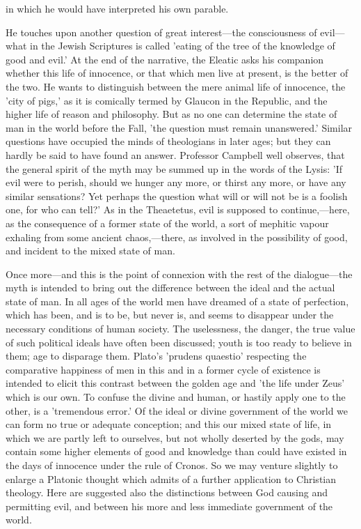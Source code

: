 \documentclass[11pt,letter]{article}
\begin{document}
in which he would have interpreted his own parable.

\par  He touches upon another question of great interest—the consciousness of evil—what in the Jewish Scriptures is called 'eating of the tree of the knowledge of good and evil.' At the end of the narrative, the Eleatic asks his companion whether this life of innocence, or that which men live at present, is the better of the two. He wants to distinguish between the mere animal life of innocence, the 'city of pigs,' as it is comically termed by Glaucon in the Republic, and the higher life of reason and philosophy. But as no one can determine the state of man in the world before the Fall, 'the question must remain unanswered.' Similar questions have occupied the minds of theologians in later ages; but they can hardly be said to have found an answer. Professor Campbell well observes, that the general spirit of the myth may be summed up in the words of the Lysis: 'If evil were to perish, should we hunger any more, or thirst any more, or have any similar sensations? Yet perhaps the question what will or will not be is a foolish one, for who can tell?' As in the Theaetetus, evil is supposed to continue,—here, as the consequence of a former state of the world, a sort of mephitic vapour exhaling from some ancient chaos,—there, as involved in the possibility of good, and incident to the mixed state of man.

\par  Once more—and this is the point of connexion with the rest of the dialogue—the myth is intended to bring out the difference between the ideal and the actual state of man. In all ages of the world men have dreamed of a state of perfection, which has been, and is to be, but never is, and seems to disappear under the necessary conditions of human society. The uselessness, the danger, the true value of such political ideals have often been discussed; youth is too ready to believe in them; age to disparage them. Plato's 'prudens quaestio' respecting the comparative happiness of men in this and in a former cycle of existence is intended to elicit this contrast between the golden age and 'the life under Zeus' which is our own. To confuse the divine and human, or hastily apply one to the other, is a 'tremendous error.' Of the ideal or divine government of the world we can form no true or adequate conception; and this our mixed state of life, in which we are partly left to ourselves, but not wholly deserted by the gods, may contain some higher elements of good and knowledge than could have existed in the days of innocence under the rule of Cronos. So we may venture slightly to enlarge a Platonic thought which admits of a further application to Christian theology. Here are suggested also the distinctions between God causing and permitting evil, and between his more and less immediate government of the world.
\end{document}
